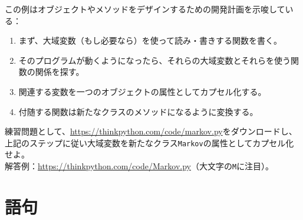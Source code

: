 \documentclass[a4j,12pt,makeidx]{jbook}
\begin{document}
この例はオブジェクトやメソッドをデザインするための開発計画を示唆している：
\begin{enumerate}
\item まず、大域変数（もし必要なら）を使って読み・書きする関数を書く。
\item そのプログラムが動くようになったら、それらの大域変数とそれらを使う関数の関係を探す。
\item 関連する変数を一つのオブジェクトの属性としてカプセル化する。
\item 付随する関数は新たなクラスのメソッドになるように変換する。
\end{enumerate} 
練習問題として、\url{https://thinkpython.com/code/markov.py}をダウンロードし、
上記のステップに従い大域変数を新たなクラス{\tt Markov}の属性としてカプセル化せよ。\\
解答例：\url{https://thinkpython.com/code/Markov.py}（大文字の{\tt M}に注目）。
%
\section{語句}
\end{document}
